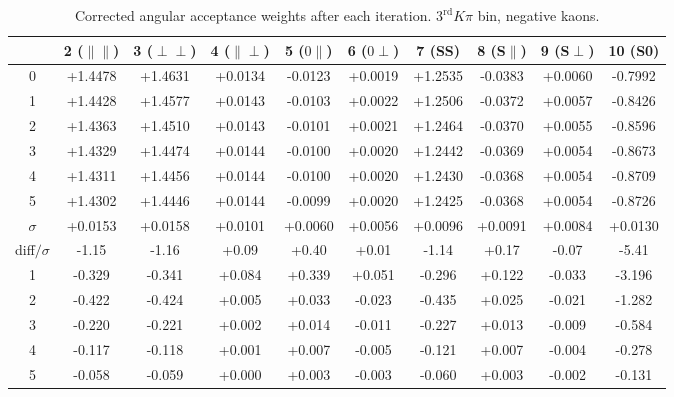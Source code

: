 \begin{table}[h!]
    \center\footnotesize
 \caption{\small Corrected angular acceptance weights after each iteration. $3^{\text{rd}}K\pi$ bin, negative kaons.}    
     \begin{tabular}{ c c c c c c c c c c}
      & 2 ($\parallel\parallel$) & 3 ($\perp\perp$) & 4 ($\parallel\perp$) & 5 ($0\parallel$) & 
      6 ($0\perp$) & 7 (SS) & 8 (S$\parallel$) & 9 (S$\perp$) & 10 (S0) \\
     \hline
      0 & +1.4478 & +1.4631 & +0.0134 & -0.0123 & +0.0019 & +1.2535 & -0.0383 & +0.0060 & -0.7992\\
      1 & +1.4428 & +1.4577 & +0.0143 & -0.0103 & +0.0022 & +1.2506 & -0.0372 & +0.0057 & -0.8426\\
      2 & +1.4363 & +1.4510 & +0.0143 & -0.0101 & +0.0021 & +1.2464 & -0.0370 & +0.0055 & -0.8596\\
      3 & +1.4329 & +1.4474 & +0.0144 & -0.0100 & +0.0020 & +1.2442 & -0.0369 & +0.0054 & -0.8673\\
      4 & +1.4311 & +1.4456 & +0.0144 & -0.0100 & +0.0020 & +1.2430 & -0.0368 & +0.0054 & -0.8709\\
      5 & +1.4302 & +1.4446 & +0.0144 & -0.0099 & +0.0020 & +1.2425 & -0.0368 & +0.0054 & -0.8726\\
     \hline
      $\sigma$ & +0.0153 & +0.0158 & +0.0101 & +0.0060 & +0.0056 & +0.0096 & +0.0091 & +0.0084 & +0.0130\\
     diff$/\sigma$& -1.15  & -1.16  & +0.09  & +0.40  & +0.01  & -1.14  & +0.17  & -0.07  & -5.41 \\
    \hline
     1 & -0.329  & -0.341  & +0.084  & +0.339  & +0.051  & -0.296  & +0.122  & -0.033  & -3.196 \\
     2 & -0.422  & -0.424  & +0.005  & +0.033  & -0.023  & -0.435  & +0.025  & -0.021  & -1.282 \\
     3 & -0.220  & -0.221  & +0.002  & +0.014  & -0.011  & -0.227  & +0.013  & -0.009  & -0.584 \\
     4 & -0.117  & -0.118  & +0.001  & +0.007  & -0.005  & -0.121  & +0.007  & -0.004  & -0.278 \\
     5 & -0.058  & -0.059  & +0.000  & +0.003  & -0.003  & -0.060  & +0.003  & -0.002  & -0.131 \\
         \end{tabular}
     \label{tab:norm_weights_evolution_7}
\end{table}
